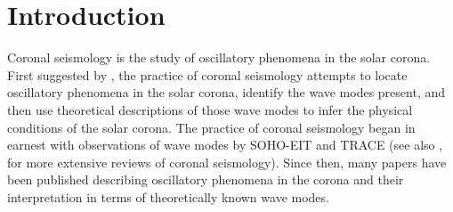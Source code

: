 \documentclass{aastex}
\begin{document}





\section{Introduction}\label{sec:int}
Coronal seismology is the study of oscillatory phenomena in the solar
corona.  First suggested by \cite{1970PASJ...22..341U}, the practice
of coronal seismology attempts to locate oscillatory phenomena in the
solar corona, identify the wave modes present, and then use
theoretical descriptions of those wave modes to infer the physical
conditions of the solar corona.  The practice of coronal seismology
began in earnest with observations of wave modes by SOHO-EIT
\citep{1998ApJ...501L.217D, 1999SoPh..186..207B} and TRACE
\citep{1999ApJ...520..880A} (see also \cite{lrsp-2005-3},
\cite{2012RSPTA.370.3193D} for more extensive reviews of coronal
seismology).  Since then, many papers have been published describing
oscillatory phenomena in the corona and their interpretation in terms
of theoretically known wave modes.
\end{document}
